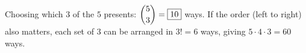 Choosing which $3$ of the $5$ presents: $\dbinom53=\boxed{10}$ ways. If the order (left to right) also matters, each set of $3$ can be arranged in $3!=6$ ways, giving $5\cdot4\cdot3=\boxed{60}$ ways.
